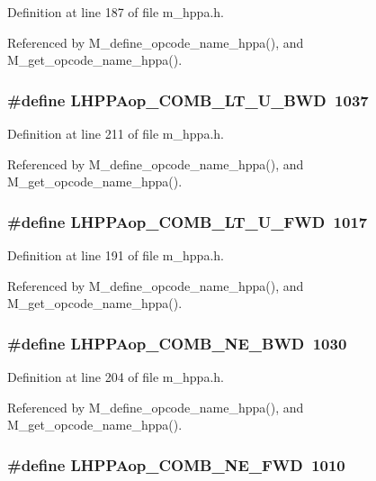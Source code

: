 Definition at line 187 of file m\_\-hppa.h.

Referenced by M\_\-define\_\-opcode\_\-name\_\-hppa(), and M\_\-get\_\-opcode\_\-name\_\-hppa().
\subsubsection{\setlength{\rightskip}{0pt plus 5cm}\#define LHPPAop\_\-COMB\_\-LT\_\-U\_\-BWD~1037}\label{m__hppa_8h_85b5b61d5ccc9a564e5304127e81a52e}




Definition at line 211 of file m\_\-hppa.h.

Referenced by M\_\-define\_\-opcode\_\-name\_\-hppa(), and M\_\-get\_\-opcode\_\-name\_\-hppa().
\subsubsection{\setlength{\rightskip}{0pt plus 5cm}\#define LHPPAop\_\-COMB\_\-LT\_\-U\_\-FWD~1017}\label{m__hppa_8h_dcd2654163de0972a6c2d095770fb114}




Definition at line 191 of file m\_\-hppa.h.

Referenced by M\_\-define\_\-opcode\_\-name\_\-hppa(), and M\_\-get\_\-opcode\_\-name\_\-hppa().
\subsubsection{\setlength{\rightskip}{0pt plus 5cm}\#define LHPPAop\_\-COMB\_\-NE\_\-BWD~1030}\label{m__hppa_8h_b52e2cb0fd33c69ac719d0a336cbf85a}




Definition at line 204 of file m\_\-hppa.h.

Referenced by M\_\-define\_\-opcode\_\-name\_\-hppa(), and M\_\-get\_\-opcode\_\-name\_\-hppa().
\subsubsection{\setlength{\rightskip}{0pt plus 5cm}\#define LHPPAop\_\-COMB\_\-NE\_\-FWD~1010}\label{m__hppa_8h_f2d28524af8eff942bfb13d2781c9a67}




